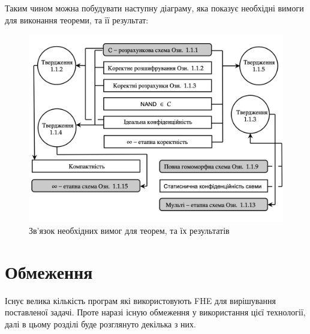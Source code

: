 Таким чином можна побудувати наступну діаграму, яка показує необхідні вимоги для 
виконання теореми, та її результат:

\begin{figure}[!h]
    \centering
    \includegraphics[scale=0.7]{static/fhe-i-hop-connection.png}
    \caption{Зв'язок необхідних вимог для теорем, та їх результатів}
    \label{fig:fhe-i-hop-connection}
\end{figure}

\section{Обмеження}
Існує велика кількість програм які використовують FHE для вирішування поставленої задачі. Проте
наразі існую обмеження у використання цієї технології, далі в цьому розділі буде розглянуто 
декілька з них. 

